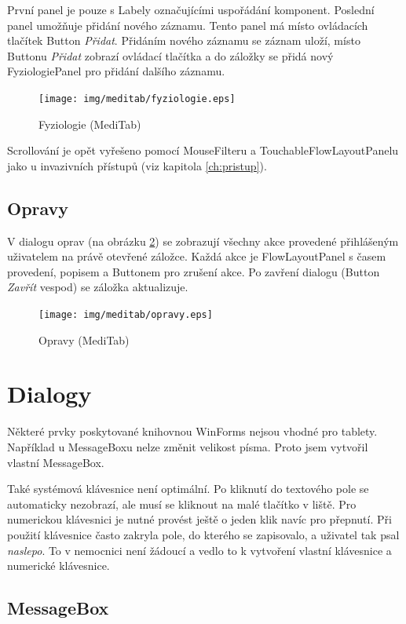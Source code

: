 První panel je pouze s Labely označujícími uspořádání komponent. Poslední panel umožňuje přidání nového záznamu. Tento panel má místo ovládacích tlačítek Button \emph{Přidat}. Přidáním nového záznamu se záznam uloží, místo Buttonu \emph{Přidat} zobrazí ovládací tlačítka a do záložky se přidá nový FyziologiePanel pro přidání dalšího záznamu.

\begin{figure}[H]
	\centering
	\texttt{[image: img/meditab/fyziologie.eps]}
	\caption{Fyziologie (MediTab)}
  \label{fig:fyziologie}
\end{figure}

Scrollování je opět vyřešeno pomocí MouseFilteru a TouchableFlowLayoutPanelu jako u invazivních přístupů (viz kapitola \ref{ch:pristup}).


\subsection{Opravy}

V dialogu oprav (na obrázku \ref{fig:opravy}) se zobrazují všechny akce provedené přihlášeným uživatelem na právě otevřené záložce. Každá akce je FlowLayoutPanel s časem provedení, popisem a Buttonem pro zrušení akce. Po zavření dialogu (Button \emph{Zavřít} vespod) se záložka aktualizuje.

\begin{figure}[H]
	\centering
	\texttt{[image: img/meditab/opravy.eps]}
	\caption{Opravy (MediTab)}
  \label{fig:opravy}
\end{figure}



\section{Dialogy}
\label{ch:dialogy}

Některé prvky poskytované knihovnou WinForms nejsou vhodné pro tablety. Například u MessageBoxu nelze změnit velikost písma. Proto jsem vytvořil vlastní MessageBox.

Také systémová klávesnice není optimální. Po kliknutí do textového pole se automaticky nezobrazí, ale musí se kliknout na malé tlačítko v liště. Pro numerickou klávesnici je nutné provést ještě o jeden klik navíc pro přepnutí. Při použití klávesnice často zakryla pole, do kterého se zapisovalo, a uživatel tak psal \emph{naslepo}. To v nemocnici není žádoucí a vedlo to k vytvoření vlastní klávesnice a numerické klávesnice.

\subsection{MessageBox}

